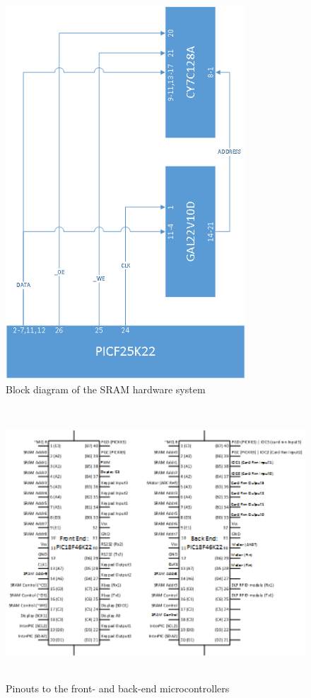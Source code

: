 \documentclass[12pt]{article} %
\begin{document}
\begin{figure}[H]
	\centering
	\includegraphics[width=0.8\textwidth]{images/SRAMHardwareBlock.png}
	\caption{Block diagram of the SRAM hardware system}
	\label{fig:sramBlockDiagram}
\end{figure}

\begin{figure}[H]
	\centering
	\includegraphics[height=4in]{images/PinOuts.png}
	\caption{Pinouts to the front- and back-end microcontrollers}
	\label{fig:pinoutDiagram}
\end{figure}
\end{document}
